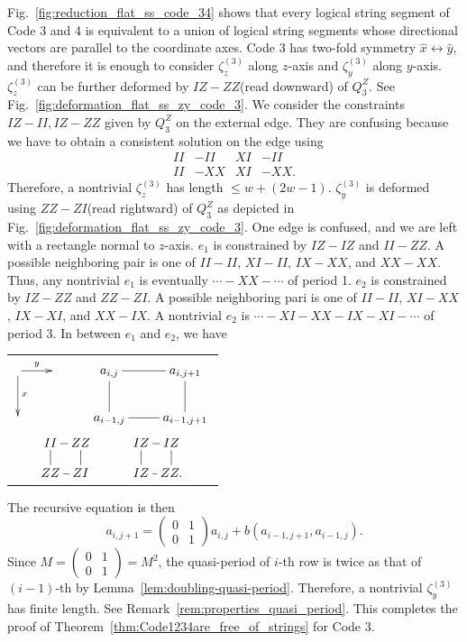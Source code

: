 \documentclass[letterpaper,10pt,pra,aps,showpacs,twocolumn]{revtex4-1}
\theoremstyle{definition} \newtheorem{defn}{Definition}
\theoremstyle{definition} \newtheorem{remark}{Remark}
\begin{document}
Fig.~\ref{fig:reduction_flat_ss_code_34} shows that every logical string segment of Code 3 and 4 is equivalent to a union of logical string segments whose directional vectors are parallel to the coordinate axes. Code 3 has two-fold symmetry $\hat{x} \leftrightarrow \hat{y}$, and therefore it is enough to consider $\zeta^{(3)}_z$ along $z$-axis and $\zeta^{(3)}_y$ along $y$-axis. $\zeta^{(3)}_z$ can be further deformed by $IZ-ZZ$(read downward) of $Q_3^Z$. See Fig.~\ref{fig:deformation_flat_ss_zy_code_3}. We consider the constraints $IZ-II, IZ-ZZ$ given by $Q_3^Z$ on the external edge. They are confusing because we have to obtain a consistent solution on the edge using
\begin{align*}
 II &- II &  XI &- II \\
 II &- XX &  XI &- XX .
\end{align*}
Therefore, a nontrivial $\zeta^{(3)}_z$ has length $\leq w+(2w-1)$. $\zeta^{(3)}_y$ is deformed using $ZZ-ZI$(read rightward) of $Q_3^Z$ as depicted in Fig.~\ref{fig:deformation_flat_ss_zy_code_3}. One edge is confused, and we are left with a rectangle normal to $z$-axis. $e_1$ is constrained by $IZ-IZ$ and $II-ZZ$. A possible neighboring pair is one of $II-II$, $XI-II$, $IX-XX$, and $XX-XX$. Thus, any nontrivial $e_1$ is eventually $\cdots - XX - \cdots$ of period 1. $e_2$ is constrained by $IZ-ZZ$ and $ZZ-ZI$. A possible neighboring pari is one of $II-II$, $XI-XX$, $IX-XI$, and $XX-IX$. A nontrivial $e_2$ is $\cdots-XI-XX-IX-XI-\cdots$ of period 3. In between $e_1$ and $e_2$, we have
\begin{center}
\begin{tabular}{c}
$\xymatrix{
\ar[r]^y \ar[d]^x &  & a_{i,j} \ar@{-}[d] \ar@{-}[r] & a_{i,j+1}\\
                  &  & a_{i-1,j}   & a_{i-1,j+1} \ar@{-}[u] \ar@{-}[l] 
}$ \\
$ \xymatrix@!0{
 II \ar@{-}[d] \ar@{-}[r]& ZZ & & IZ\ar@{-}[d] \ar@{-}[r] & IZ \\
 ZZ & ZI\ar@{-}[u] \ar@{-}[l]  & & IZ & ZZ .\ar@{-}[u] \ar@{-}[l] 
}$
\end{tabular}
\end{center}
The recursive equation is then
\[
 a_{i,j+1} = \begin{pmatrix} 0 & 1 \\ 0 & 1 \end{pmatrix} a_{i,j} + b( a_{i-1,j+1}, a_{i-1,j} ) .
\]
Since $M = \begin{pmatrix} 0 & 1 \\ 0 & 1 \end{pmatrix} = M^2$, the quasi-period of $i$-th row is twice as that of $(i-1)$-th by Lemma~\ref{lem:doubling-quasi-period}. Therefore, a nontrivial $\zeta^{(3)}_y$ has finite length. See Remark~\ref{rem:properties_quasi_period}. This completes the proof of Theorem~\ref{thm:Code1234are_free_of_strings} for Code 3.
\end{document}
